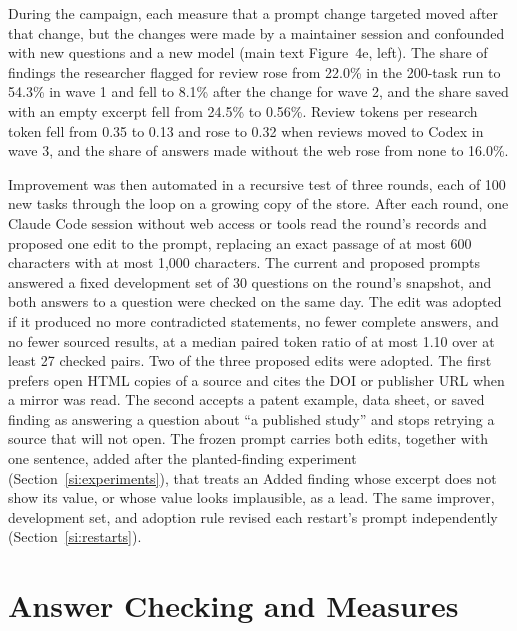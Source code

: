 \documentclass[journal=mamobx,manuscript=suppinfo]{achemso}
\begin{document}
During the campaign, each measure that a prompt change targeted moved after that change, but the changes were made by a maintainer session and confounded with new questions and a new model (main text Figure~4e, left).
The share of findings the researcher flagged for review rose from 22.0\% in the 200-task run to 54.3\% in wave 1 and fell to 8.1\% after the change for wave 2, and the share saved with an empty excerpt fell from 24.5\% to 0.56\%.
Review tokens per research token fell from 0.35 to 0.13 and rose to 0.32 when reviews moved to Codex in wave 3, and the share of answers made without the web rose from none to 16.0\%.

Improvement was then automated in a recursive test of three rounds, each of 100 new tasks through the loop on a growing copy of the store.
After each round, one Claude Code session without web access or tools read the round's records and proposed one edit to the prompt, replacing an exact passage of at most 600 characters with at most 1,000 characters.
The current and proposed prompts answered a fixed development set of 30 questions on the round's snapshot, and both answers to a question were checked on the same day.
The edit was adopted if it produced no more contradicted statements, no fewer complete answers, and no fewer sourced results, at a median paired token ratio of at most 1.10 over at least 27 checked pairs.
Two of the three proposed edits were adopted.
The first prefers open HTML copies of a source and cites the DOI or publisher URL when a mirror was read.
The second accepts a patent example, data sheet, or saved finding as answering a question about ``a published study'' and stops retrying a source that will not open.
The frozen prompt carries both edits, together with one sentence, added after the planted-finding experiment (Section~\ref{si:experiments}), that treats an Added finding whose excerpt does not show its value, or whose value looks implausible, as a lead.
The same improver, development set, and adoption rule revised each restart's prompt independently (Section~\ref{si:restarts}).

\section{Answer Checking and Measures}
\label{si:checking}
\end{document}
